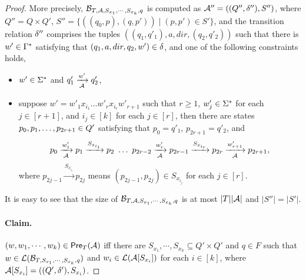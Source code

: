 \begin{proof}
More precisely, $\mathcal{B}_{T, \mathcal{A}, S_{x_1}, \cdots, S_{x_k}, q}$ is computed as
$\mathcal{A}'' = ((Q'', \delta''), S'')$, where $Q'' = Q \times Q'$, $S'' = \{((q_0, p), (q, p')) \mid (p, p') \in S'\}$, and the transition relation $\delta''$ comprises the tuples $((q_1, q'_1), a, dir, (q_2, q'_2))$ such that there is $w' \in \Gamma^*$ satisfying that $(q_1, a, dir, q_2, w') \in \delta$, and one of the following constraints holds, 
\begin{itemize}
\item $w' \in \Sigma^*$  and $q'_1 \xrightarrow[\mathcal{A}]{w'} q'_2$, 
%
\item suppose $w' = w'_1 x_{i_1} \ldots w'_{r} x_{i_{r}} w'_{r+1}$ such that $r \ge 1$, $w'_j \in \Sigma^*$ for each $j \in [r+1]$,  and $i_j \in [k]$ for each $j \in [r]$, then there are states $p_0, p_1, \ldots, p_{2r+1} \in Q'$ satisfying that $p_0 = q'_1$, $p_{2r+1} = q'_2$, and 
$$p_0 \xrightarrow[\mathcal{A}]{w'_1} p_1 \xrightarrow{S_{x_{i_1}}} p_2\ \ldots\ p_{2r-2} \xrightarrow[\mathcal{A}]{w'_r}p_{2r-1} \xrightarrow{S_{x_{i_r}}} p_{2r} \xrightarrow[\mathcal{A}]{w'_{r+1}} p_{2r+1},$$ 
where $p_{2j-1} \xrightarrow{S_{x_{i_j}}} p_{2j}$ means $(p_{2j-1}, p_{2j}) \in S_{x_{i_j}}$ for each $j \in [r]$.
\end{itemize}
%
%
It is easy to see that  the size of $\mathcal{B}_{T, \mathcal{A}, S_{x_1}, \cdots, S_{x_k}, q}$ is at most $|T||\mathcal{A}|$ and $|S''| = |S'|$.   



\paragraph{Claim.} %
$(w, w_1,\cdots, w_k) \in \textsf{Pre}_{T}(\mathcal{A})$ iff there are $S_{x_1}, \cdots, S_{x_k} \subseteq Q' \times Q'$ and $q \in F$ such that $w \in \mathcal{L}(\mathcal{B}_{T, S_{x_1}, \cdots, S_{x_k}, q})$ and $w_i \in \mathcal{L}(\mathcal{A}[S_{x_i}])$ for each $i \in [k]$, where $\mathcal{A}[S_{x_i}]=((Q', \delta'), S_{x_i})$.


\end{proof}

